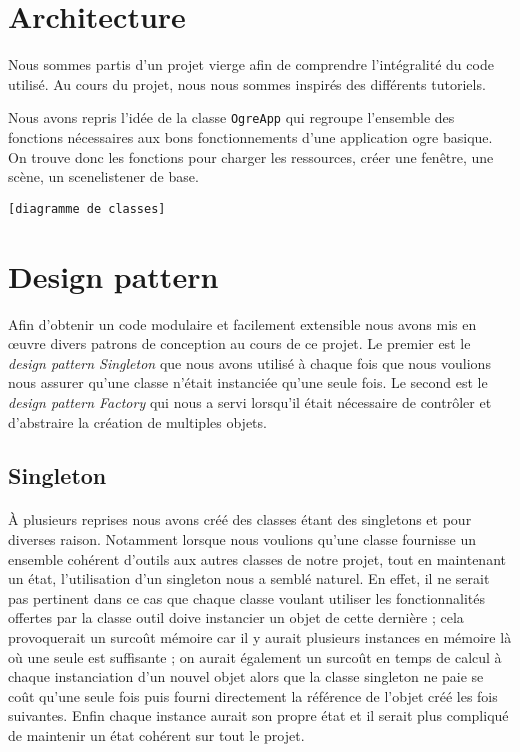 \section{Architecture}
Nous sommes partis d'un projet vierge afin de comprendre l'intégralité du code
utilisé. Au cours du projet, nous nous sommes inspirés des différents
tutoriels.

Nous avons repris l'idée de la classe \texttt{OgreApp} qui regroupe l'ensemble
des fonctions nécessaires aux bons fonctionnements d'une application ogre
basique. On trouve donc les fonctions pour charger les ressources, créer une
fenêtre, une scène, un scenelistener de base.

\verb![diagramme de classes]!


\section{Design pattern}

Afin d'obtenir un code modulaire et facilement extensible nous avons mis en
œuvre divers patrons de conception au cours de ce projet. Le premier est le
\emph{design pattern Singleton} que nous avons utilisé à chaque fois que nous
voulions nous assurer qu'une classe n'était instanciée qu'une seule fois. Le
second est le \emph{design pattern Factory} qui nous a servi lorsqu'il était
nécessaire de contrôler et d'abstraire la création de multiples objets.

\subsection{Singleton}

\paragraph{}
À plusieurs reprises nous avons créé des classes étant des singletons et pour
diverses raison. Notamment lorsque nous voulions qu'une classe fournisse un
ensemble cohérent d'outils aux autres classes de notre projet, tout en
maintenant un état, l'utilisation d'un singleton nous a semblé naturel. En
effet, il ne serait pas pertinent dans ce cas que chaque classe voulant
utiliser les fonctionnalités offertes par la classe outil doive instancier un
objet de cette dernière ; cela provoquerait un surcoût mémoire car il y aurait
plusieurs instances en mémoire là où une seule est suffisante ; on aurait
également un surcoût en temps de calcul à chaque instanciation d'un nouvel
objet alors que la classe singleton ne paie se coût qu'une seule fois puis
fourni directement la référence de l'objet créé les fois suivantes. Enfin
chaque instance aurait son propre état et il serait plus compliqué de
maintenir un état cohérent sur tout le projet.

